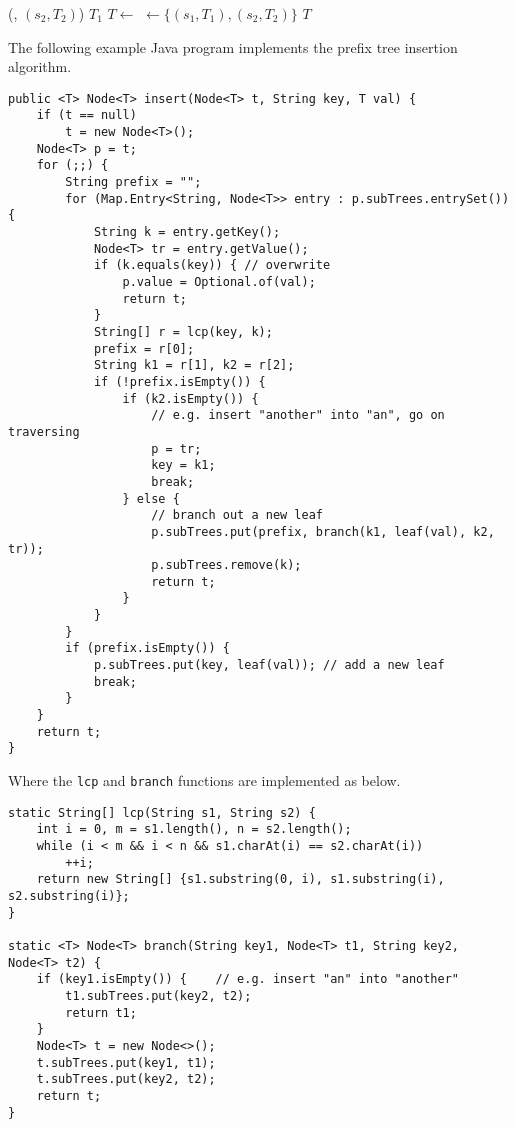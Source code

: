 \documentclass{article}
\begin{document}
\begin{algorithmic}[1]
    \State {}(, $(s_2, T_2)$)
    \State \Return $T_1$
  \EndIf
  \State $T \gets$ 
  \State {} $\gets \{(s_1, T_1), (s_2, T_2)\}$
  \State \Return $T$
\EndFunction
\end{algorithmic}

The following example Java program implements the prefix tree insertion algorithm.

\lstset{language=Java}
\begin{lstlisting}
public <T> Node<T> insert(Node<T> t, String key, T val) {
    if (t == null)
        t = new Node<T>();
    Node<T> p = t;
    for (;;) {
        String prefix = "";
        for (Map.Entry<String, Node<T>> entry : p.subTrees.entrySet()) {
            String k = entry.getKey();
            Node<T> tr = entry.getValue();
            if (k.equals(key)) { // overwrite
                p.value = Optional.of(val);
                return t;
            }
            String[] r = lcp(key, k);
            prefix = r[0];
            String k1 = r[1], k2 = r[2];
            if (!prefix.isEmpty()) {
                if (k2.isEmpty()) {
                    // e.g. insert "another" into "an", go on traversing
                    p = tr;
                    key = k1;
                    break;
                } else {
                    // branch out a new leaf
                    p.subTrees.put(prefix, branch(k1, leaf(val), k2, tr));
                    p.subTrees.remove(k);
                    return t;
                }
            }
        }
        if (prefix.isEmpty()) {
            p.subTrees.put(key, leaf(val)); // add a new leaf
            break;
        }
    }
    return t;
}
\end{lstlisting}

Where the \texttt{lcp} and \texttt{branch} functions are implemented as below.

\begin{lstlisting}
static String[] lcp(String s1, String s2) {
    int i = 0, m = s1.length(), n = s2.length();
    while (i < m && i < n && s1.charAt(i) == s2.charAt(i))
        ++i;
    return new String[] {s1.substring(0, i), s1.substring(i), s2.substring(i)};
}

static <T> Node<T> branch(String key1, Node<T> t1, String key2, Node<T> t2) {
    if (key1.isEmpty()) {    // e.g. insert "an" into "another"
        t1.subTrees.put(key2, t2);
        return t1;
    }
    Node<T> t = new Node<>();
    t.subTrees.put(key1, t1);
    t.subTrees.put(key2, t2);
    return t;
}
\end{lstlisting}
\end{document}
